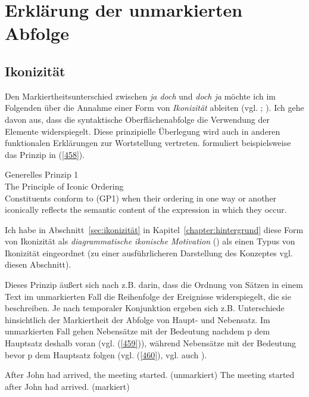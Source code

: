 \section{Erklärung der unmarkierten Abfolge}
\label{sec:unmarkiert} 
\subsection{Ikonizität}
Den Markiertheitsunterschied zwischen \textit{ja doch} und \textit{doch ja} möchte ich im Folgenden über die Annahme einer Form von \textit{Ikonizität}  ableiten (vgl. \citealt[197-200]{Mueller2014a}; \citeyear[223-226]{Mueller2017b}). Ich gehe davon aus, dass die syntaktische Oberflächenabfolge die Verwendung der Elemente widerspiegelt. Diese prinzipielle Überlegung wird auch in anderen funktionalen Erklärungen zur Wortstellung vertreten. \citet[399]{Dik1997} formuliert beispielsweise das Prinzip in (\ref{458}).
\setcounter{equation}{0}
\begin{exe}
	\ex\label{458} Generelles Prinzip 1\\
 		The Principle of Iconic Ordering\\
		Constituents  conform to (GP1) when their ordering in one way or another iconically reflects the semantic 				content of the expression in which they occur. 
	\hfill\hbox {\citet[399]{Dik1997}}
\end{exe}
Ich habe in Abschnitt~\ref{sec:ikonizität} in Kapitel~\ref{chapter:hintergrund} diese Form von Ikonizität als \textit{diagrammatische ikonische Motivation} (\citealt[516]{Haiman1980})  als einen Typus von Ikonizität eingeordnet (zu einer ausführlicheren Darstellung des Konzeptes vgl. diesen Abschnitt).

Dieses Prinzip äußert sich nach \citet[399]{Dik1997} z.B. darin, dass die Ordnung von Sätzen in einem Text im unmarkierten Fall die Reihenfolge der Ereignisse widerspiegelt, die sie beschreiben. Je nach temporaler Konjunktion  ergeben sich z.B. Unterschiede hinsichtlich der Markiertheit der Abfolge von Haupt- und Nebensatz. Im unmarkierten Fall gehen Nebensätze mit der Bedeutung \glq nachdem p\grq {} dem Hauptsatz deshalb voran (vgl. (\ref{459})), während Nebensätze mit der Bedeutung \glq bevor p\grq {} dem Hauptsatz folgen (vgl. (\ref{460}), vgl. auch \citealt{Diessel2008}).

\begin{exe}
	\ex\label{459} 
		\begin{xlist}
			\ex\label{459a} After John had arrived, the meeting started. (unmarkiert)
 			\ex\label{459b}	The meeting started after John had arrived. (markiert)
 		\end{xlist}		
\end{exe}


